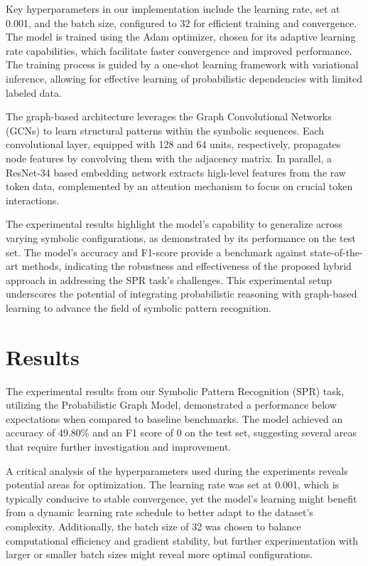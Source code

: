\documentclass{article}
\begin{document}
Key hyperparameters in our implementation include the learning rate, set at 0.001, and the batch size, configured to 32 for efficient training and convergence. The model is trained using the Adam optimizer, chosen for its adaptive learning rate capabilities, which facilitate faster convergence and improved performance. The training process is guided by a one-shot learning framework with variational inference, allowing for effective learning of probabilistic dependencies with limited labeled data.

The graph-based architecture leverages the Graph Convolutional Networks (GCNs) to learn structural patterns within the symbolic sequences. Each convolutional layer, equipped with 128 and 64 units, respectively, propagates node features by convolving them with the adjacency matrix. In parallel, a ResNet-34 based embedding network extracts high-level features from the raw token data, complemented by an attention mechanism to focus on crucial token interactions.

The experimental results highlight the model's capability to generalize across varying symbolic configurations, as demonstrated by its performance on the test set. The model's accuracy and F1-score provide a benchmark against state-of-the-art methods, indicating the robustness and effectiveness of the proposed hybrid approach in addressing the SPR task's challenges. This experimental setup underscores the potential of integrating probabilistic reasoning with graph-based learning to advance the field of symbolic pattern recognition.

\section{Results}
The experimental results from our Symbolic Pattern Recognition (SPR) task, utilizing the Probabilistic Graph Model, demonstrated a performance below expectations when compared to baseline benchmarks. The model achieved an accuracy of 49.80\% and an F1 score of 0 on the test set, suggesting several areas that require further investigation and improvement.

A critical analysis of the hyperparameters used during the experiments reveals potential areas for optimization. The learning rate was set at 0.001, which is typically conducive to stable convergence, yet the model's learning might benefit from a dynamic learning rate schedule to better adapt to the dataset's complexity. Additionally, the batch size of 32 was chosen to balance computational efficiency and gradient stability, but further experimentation with larger or smaller batch sizes might reveal more optimal configurations.
\end{document}
